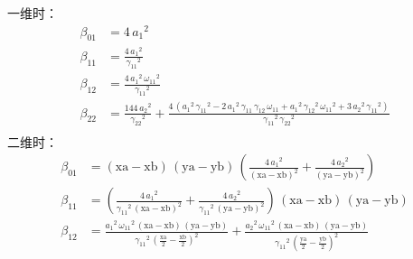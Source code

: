 \documentclass{book}
\begin{document}
一维时：
\begin{equation}
    \begin{aligned}
        \beta_{01} & = 4\,{a_1 }^2                                                                                                                                                                                                                                                                 \\
        \beta_{11} & = \frac{4\,{a_1 }^2 }{{\gamma_{11} }^2 }                                                                                                                                                                                                                                      \\
        \beta_{12} & = \frac{4\,{a_1 }^2 \,{\omega_{11} }^2 }{{\gamma_{11} }^2 }                                                                                                                                                                                                                   \\
        \beta_{22} & = \frac{144\,{a_2 }^2 }{{\gamma_{22} }^2 }+\frac{4\,{\left({a_1 }^2 \,{\gamma_{11} }^2 -2\,{a_1 }^2 \,\gamma_{11} \,\gamma_{12} \,\omega_{11} +{a_1 }^2 \,{\gamma_{12} }^2 \,{\omega_{11} }^2 +3\,{a_2 }^2 \,{\gamma_{11} }^2 \right)}}{{\gamma_{11} }^2 \,{\gamma_{22} }^2 } \\
    \end{aligned}
\end{equation}
二维时：
\begin{equation}
    \begin{aligned}
        \beta_{01} & = {\left(\mathrm{xa}-\mathrm{xb}\right)}\,{\left(\mathrm{ya}-\mathrm{yb}\right)}\,{\left(\frac{4\,{a_1 }^2 }{{{\left(\mathrm{xa}-\mathrm{xb}\right)}}^2 }+\frac{4\,{a_2 }^2 }{{{\left(\mathrm{ya}-\mathrm{yb}\right)}}^2 }\right)}                                                                                                                                                                                \\
        \beta_{11} & = {\left(\frac{4\,{a_1 }^2 }{{\gamma_{11} }^2 \,{{\left(\mathrm{xa}-\mathrm{xb}\right)}}^2 }+\frac{4\,{a_2 }^2 }{{\gamma_{11} }^2 \,{{\left(\mathrm{ya}-\mathrm{yb}\right)}}^2 }\right)}\,{\left(\mathrm{xa}-\mathrm{xb}\right)}\,{\left(\mathrm{ya}-\mathrm{yb}\right)}                                                                                                                                          \\
        \beta_{12} & = \frac{{a_1 }^2 \,{\omega_{11} }^2 \,{\left(\mathrm{xa}-\mathrm{xb}\right)}\,{\left(\mathrm{ya}-\mathrm{yb}\right)}}{{\gamma_{11} }^2 \,{{\left(\frac{\mathrm{xa}}{2}-\frac{\mathrm{xb}}{2}\right)}}^2 }+\frac{{a_2 }^2 \,{\omega_{11} }^2 \,{\left(\mathrm{xa}-\mathrm{xb}\right)}\,{\left(\mathrm{ya}-\mathrm{yb}\right)}}{{\gamma_{11} }^2 \,{{\left(\frac{\mathrm{ya}}{2}-\frac{\mathrm{yb}}{2}\right)}}^2 } \\
    \end{aligned}
\end{equation}
\end{document}

